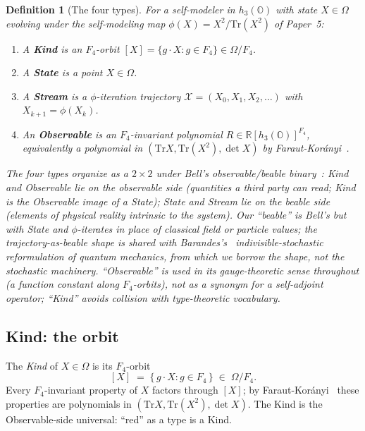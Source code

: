 \documentclass[12pt]{article}
\newtheorem{definition}[theorem]{Definition}
\theoremstyle{remark}
\newcommand{\hthree}{h_3(\mathbb{O})}
\newcommand{\Ffour}{F_4}
\newcommand{\Stream}{\mathcal{X}}
\newcommand{\Tr}{\mathrm{Tr}}
\begin{document}
\begin{definition}[The four types]\label{def:ontology}
For a self-modeler in $\hthree$ with state $X \in \Omega$ evolving
under the self-modeling map $\phi(X) = X^2/\Tr(X^2)$ of Paper~5:
\begin{enumerate}[label=(\roman*)]
  \item\label{type:kind} A \textbf{Kind} is an $\Ffour$-orbit
    $[X] = \{g \cdot X : g \in \Ffour\} \in \Omega/\Ffour$.
  \item\label{type:state} A \textbf{State} is a point $X \in \Omega$.
  \item\label{type:stream} A \textbf{Stream} is a $\phi$-iteration
    trajectory $\Stream = (X_0, X_1, X_2, \ldots)$ with
    $X_{k+1} = \phi(X_k)$.
  \item\label{type:observable} An \textbf{Observable} is an
    $\Ffour$-invariant polynomial
    $R \in \mathbb{R}[\hthree]^{\Ffour}$, equivalently a polynomial
    in $(\Tr X, \Tr(X^2), \det X)$ by
    Faraut-Kor\'anyi~\cite{faraut-koranyi1994}.
\end{enumerate}
The four types organize as a $2\times 2$ under Bell's
\emph{observable}/\emph{beable}
binary~\cite{bell1984speakable}: Kind and Observable lie on the
observable side (quantities a third party can read; Kind is the
Observable image of a State); State and Stream lie on the beable
side (elements of physical reality intrinsic to the system). Our
``beable'' is Bell's but with State and $\phi$-iterates in place of
classical field or particle values; the trajectory-as-beable shape
is shared with Barandes's~\cite{barandes2023stochquantum}
indivisible-stochastic reformulation of quantum mechanics, from which
we borrow the shape, not the stochastic machinery. ``Observable''
is used in its gauge-theoretic sense throughout (a function constant
along $\Ffour$-orbits), not as a synonym for a self-adjoint operator;
``Kind'' avoids collision with type-theoretic vocabulary.
\end{definition}

\subsection{Kind: the orbit}
\label{sec:kind}

The \emph{Kind} of $X \in \Omega$ is its $\Ffour$-orbit
\begin{equation}\label{eq:kind}
  [X] \;=\; \{\,g \cdot X : g \in \Ffour\,\} \;\in\; \Omega / \Ffour.
\end{equation}
Every $\Ffour$-invariant property of $X$ factors through $[X]$; by
Faraut-Kor\'anyi~\cite{faraut-koranyi1994} these properties are
polynomials in $(\Tr X, \Tr(X^2), \det X)$. The Kind is the
Observable-side universal: ``red'' as a type is a Kind.
\end{document}
